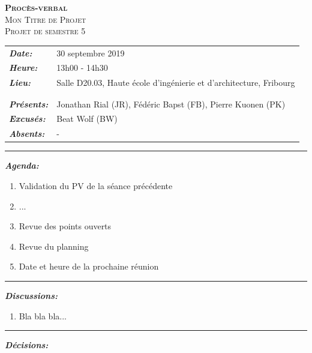 \documentclass[a4paper]{article}
\newcommand{\HRule}{\vspace{12pt}\noindent\rule{\linewidth}{0.4pt}\vspace{12pt}}
\begin{document}
\begin{center}
	\textsc{\huge \bfseries Procès-verbal} \\ [0.3cm]
	\textsc{\LARGE Mon Titre de Projet} \\ [0.3cm]
	\textsc{\large Projet de semestre 5} \\ [0.8cm]
\end{center}


\noindent
\begin{tabularx}{\textwidth}{lX}
	\textbf{\textit{Date:}}     & 30 septembre 2019 \\
	\textbf{\textit{Heure:}}    & 13h00 - 14h30 \\
	\textbf{\textit{Lieu:}}     & Salle D20.03, Haute école d'ingénierie et d'architecture, Fribourg \\ \\
	\hline \\
	\textbf{\textit{Présents:}} & Jonathan Rial (JR), Fédéric Bapst (FB), Pierre Kuonen (PK) \\
	\textbf{\textit{Excusés:}}  & Beat Wolf (BW) \\
	\textbf{\textit{Absents:}}  & -
\end{tabularx}

\HRule


\textbf{\textit{Agenda:}}

\begin{enumerate}
	\item Validation du PV de la séance précédente
	\item ...
	\item Revue des points ouverts
	\item Revue du planning
	\item Date et heure de la prochaine réunion
\end{enumerate}

\HRule


\textbf{\textit{Discussions:}}

\begin{enumerate}
	\item Bla bla bla...
\end{enumerate}

\HRule


\textbf{\textit{Décisions:}}
\end{document}
